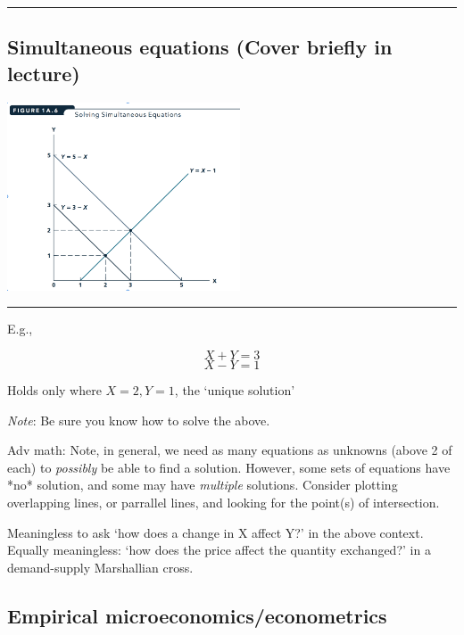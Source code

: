 \documentclass[]{article}
\begin{document}
\begin{center}\rule{0.5\linewidth}{\linethickness}\end{center}

\hypertarget{simultaneous-equations-cover-briefly-in-lecture}{%
\subsection{Simultaneous equations (Cover briefly in
lecture)}\label{simultaneous-equations-cover-briefly-in-lecture}}

\includegraphics[height=2.2in]{picsfigs/simeqn.png}

\begin{center}\rule{0.5\linewidth}{\linethickness}\end{center}

E.g.,

\[ X + Y = 3 \] \[ X - Y = 1 \]

Holds only where \(X=2, Y=1\), the `unique solution'

\emph{Note}: Be sure you know how to solve the above.

\textcolor{RawSienna}{Adv math: Note, in general, we need as many equations as unknowns (above 2 of each) to \emph{possibly} be able to find a solution.  However, some sets of equations have *no* solution, and some may have \emph{multiple} solutions.  Consider plotting overlapping lines, or parrallel lines, and looking for the point(s) of intersection.}

\bigskip

Meaningless to ask `how does a change in X affect Y?' in the above
context. Equally meaningless: `how does the price affect the quantity
exchanged?' in a demand-supply Marshallian cross.

\hypertarget{empirical-microeconomicseconometrics}{%
\subsection{Empirical
microeconomics/econometrics}\label{empirical-microeconomicseconometrics}}
\end{document}
